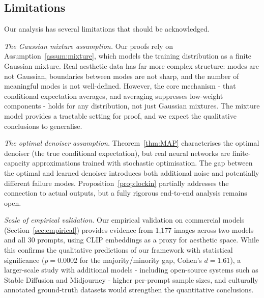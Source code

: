 \documentclass[11pt]{article}
\begin{document}
\subsection{Limitations}

Our analysis has several limitations that should be acknowledged.

\textit{The Gaussian mixture assumption.} Our proofs rely on Assumption~\ref{assum:mixture}, which models the training distribution as a finite Gaussian mixture. Real aesthetic data has far more complex structure: modes are not Gaussian, boundaries between modes are not sharp, and the number of meaningful modes is not well-defined. However, the core mechanism - that conditional expectation averages, and averaging suppresses low-weight components - holds for any distribution, not just Gaussian mixtures. The mixture model provides a tractable setting for proof, and we expect the qualitative conclusions to generalise.

\textit{The optimal denoiser assumption.} Theorem~\ref{thm:MAP} characterises the optimal denoiser (the true conditional expectation), but real neural networks are finite-capacity approximations trained with stochastic optimisation. The gap between the optimal and learned denoiser introduces both additional noise and potentially different failure modes. Proposition~\ref{prop:lockin} partially addresses the connection to actual outputs, but a fully rigorous end-to-end analysis remains open.

\textit{Scale of empirical validation.} Our empirical validation on commercial models (Section~\ref{sec:empirical}) provides evidence from 1{,}177 images across two models and all 30 prompts, using CLIP embeddings as a proxy for aesthetic space. While this confirms the qualitative predictions of our framework with statistical significance ($p = 0.0002$ for the majority/minority gap, Cohen's $d = 1.61$), a larger-scale study with additional models - including open-source systems such as Stable Diffusion and Midjourney - higher per-prompt sample sizes, and culturally annotated ground-truth datasets would strengthen the quantitative conclusions.
\end{document}
